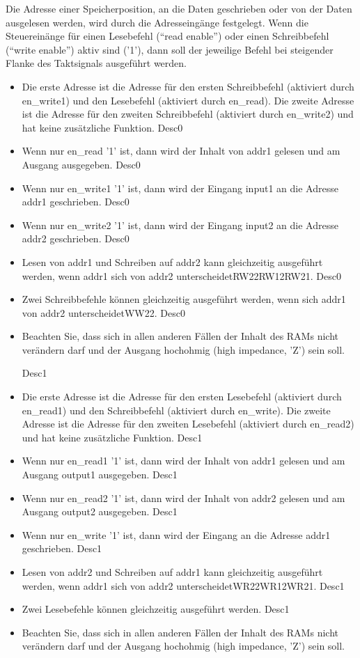 \documentclass[a4paper,12pt]{article}
\begin{document}
Die Adresse einer Speicherposition, an die Daten geschrieben oder von der Daten ausgelesen werden, wird durch die Adresseing\"ange festgelegt. Wenn die Steuerein\"ange f\"ur einen Lesebefehl ("`read enable"') oder einen Schreibbefehl ("`write enable"') aktiv sind ('1'), dann soll der jeweilige Befehl bei steigender Flanke des Taktsignals ausgef\"uhrt werden.

\begin{itemize}
{{Desc0}}\item Die erste Adresse ist die Adresse f\"ur den ersten Schreibbefehl (aktiviert durch en\_write1) und den Lesebefehl (aktiviert durch en\_read). Die zweite Adresse ist die Adresse f\"ur den zweiten Schreibbefehl (aktiviert durch en\_write2) und hat keine zus\"atzliche Funktion.
{{Desc0}}\item Wenn nur en\_read '1' ist, dann wird der Inhalt von addr1 gelesen und am Ausgang ausgegeben.
{{Desc0}}\item Wenn nur en\_write1 '1' ist, dann wird der Eingang input1 an die Adresse addr1 geschrieben.
{{Desc0}}\item Wenn nur en\_write2 '1' ist, dann wird der Eingang input2 an die Adresse addr2 geschrieben.
{{Desc0}}\item Lesen von addr1 und Schreiben auf addr2 kann gleichzeitig ausgef\"uhrt werden, wenn addr1 sich von addr2 unterscheidet{{RW22}}{{RW12}}{{RW21}}.
{{Desc0}}\item Zwei Schreibbefehle k\"onnen gleichzeitig ausgef\"uhrt werden, wenn sich addr1 von addr2 unterscheidet{{WW22}}.
{{Desc0}}\item Beachten Sie, dass sich in allen anderen F\"allen der Inhalt des RAMs nicht ver\"andern darf und der Ausgang hochohmig (high impedance, 'Z') sein soll.


{{Desc1}}\item Die erste Adresse ist die Adresse f\"ur den ersten Lesebefehl (aktiviert durch en\_read1) und den Schreibbefehl (aktiviert durch en\_write). Die zweite Adresse ist die Adresse f\"ur den zweiten Lesebefehl (aktiviert durch en\_read2) und hat keine zus\"atzliche Funktion.
{{Desc1}}\item Wenn nur en\_read1 '1' ist, dann wird der Inhalt von addr1 gelesen und am Ausgang output1 ausgegeben.
{{Desc1}}\item Wenn nur en\_read2 '1' ist, dann wird der Inhalt von addr2 gelesen und am Ausgang output2 ausgegeben.
{{Desc1}}\item Wenn nur en\_write '1' ist, dann wird der Eingang an die Adresse addr1 geschrieben.
{{Desc1}}\item Lesen von addr2 und Schreiben auf addr1 kann gleichzeitig ausgef\"uhrt werden, wenn addr1 sich von addr2 unterscheidet{{WR22}}{{WR12}}{{WR21}}.
{{Desc1}}\item Zwei Lesebefehle k\"onnen gleichzeitig ausgef\"uhrt werden.
{{Desc1}}\item Beachten Sie, dass sich in allen anderen F\"allen der Inhalt des RAMs nicht ver\"andern darf und der Ausgang hochohmig (high impedance, 'Z') sein soll.



\end{itemize}
\end{document}
